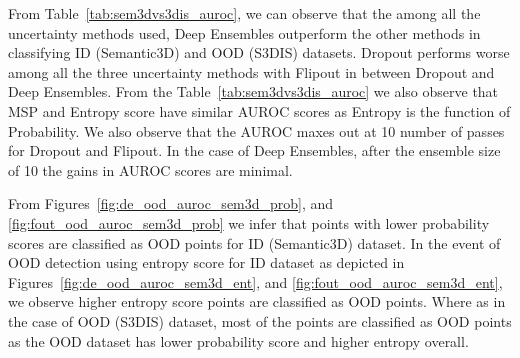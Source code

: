     From Table~\ref{tab:sem3dvs3dis_auroc}, we can observe that the among all the uncertainty methods used, Deep Ensembles outperform the other methods in classifying ID (Semantic3D) and OOD (S3DIS) datasets.
    Dropout performs worse among all the three uncertainty methods with Flipout in between Dropout and Deep Ensembles.
    From the Table~\ref{tab:sem3dvs3dis_auroc} we also observe that MSP and Entropy score have similar AUROC scores as Entropy is the function of Probability.
    We also observe that the AUROC maxes out at 10 number of passes for Dropout and Flipout.
    In the case of Deep Ensembles, after the ensemble size of 10 the gains in AUROC scores are minimal.

    From Figures~\ref{fig:de_ood_auroc_sem3d_prob}, and \ref{fig:fout_ood_auroc_sem3d_prob} we infer that points with lower probability scores are classified as OOD points for ID (Semantic3D) dataset.
    In the event of OOD detection using entropy score for ID dataset as depicted in Figures~\ref{fig:de_ood_auroc_sem3d_ent}, and \ref{fig:fout_ood_auroc_sem3d_ent}, we observe higher entropy score points are classified as OOD points.
    Where as in the case of OOD (S3DIS) dataset, most of the points are classified as OOD points as the OOD dataset has lower probability score and higher entropy overall.


